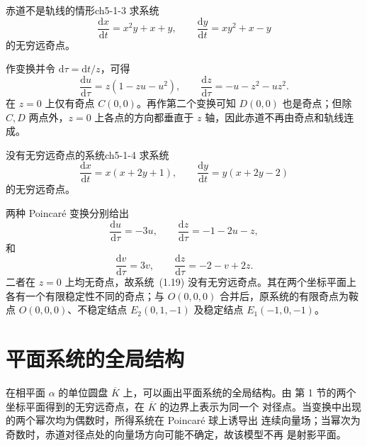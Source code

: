 \begin{example}{赤道不是轨线的情形}{ch5-1-3}
求系统
\[
  \dfrac{\mathrm{d}x}{\mathrm{d}t}=x^2y+x+y,\qquad
  \dfrac{\mathrm{d}y}{\mathrm{d}t}=xy^2+x-y \tag{1.17}
\]
的无穷远奇点。
\end{example}
\begin{solution}
作变换并令 $\mathrm{d}\tau=\mathrm{d}t/z$，可得
\[
  \dfrac{\mathrm{d}u}{\mathrm{d}\tau}=z(1-zu-u^2),\qquad
  \dfrac{\mathrm{d}z}{\mathrm{d}\tau}=-u-z^2-uz^2. \tag{1.18}
\]
在 $z=0$ 上仅有奇点 $C(0,0)$。再作第二个变换可知 $D(0,0)$ 也是奇点；但除
$C,D$ 两点外，$z=0$ 上各点的方向都垂直于 $z$ 轴，因此赤道不再由奇点和轨线连成。
\end{solution}

\begin{example}{没有无穷远奇点的系统}{ch5-1-4}
求系统
\[
  \dfrac{\mathrm{d}x}{\mathrm{d}t}=x(x+2y+1),\qquad
  \dfrac{\mathrm{d}y}{\mathrm{d}t}=y(x+2y-2) \tag{1.19}
\]
的无穷远奇点。
\end{example}
\begin{solution}
两种 Poincar\'e 变换分别给出
\[
  \dfrac{\mathrm{d}u}{\mathrm{d}\tau}=-3u,\qquad
  \dfrac{\mathrm{d}z}{\mathrm{d}\tau}=-1-2u-z, \tag{1.20}
\]
和
\[
  \dfrac{\mathrm{d}v}{\mathrm{d}\tau}=3v,\qquad
  \dfrac{\mathrm{d}z}{\mathrm{d}\tau}=-2-v+2z. \tag{1.21}
\]
二者在 $z=0$ 上均无奇点，故系统~(1.19) 没有无穷远奇点。其在两个坐标平面上
各有一个有限稳定性不同的奇点；与 $O(0,0,0)$ 合并后，原系统的有限奇点为鞍点
$O(0,0,0)$、不稳定结点 $E_2(0,1,-1)$ 及稳定结点 $E_1(-1,0,-1)$。
\end{solution}


\section{平面系统的全局结构}

在相平面 $\alpha$ 的单位圆盘 $\overline K$ 上，可以画出平面系统的全局结构。由
第 1 节的两个坐标平面得到的无穷远奇点，在 $\overline K$ 的边界上表示为同一个
对径点。当变换中出现的两个幂次均为偶数时，所得系统在 Poincar\'e 球上诱导出
连续向量场；当幂次为奇数时，赤道对径点处的向量场方向可能不确定，故该模型不再
是射影平面。

